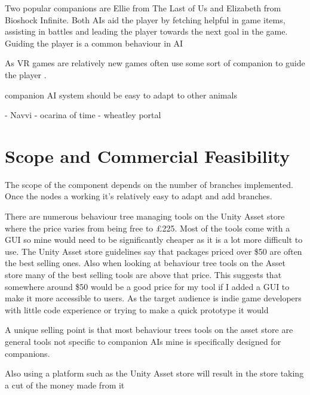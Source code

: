 \documentclass{scrartcl}
\begin{document}
Two popular companions are Ellie from The Last of Us and Elizabeth from Bioshock Infinite. Both AIs aid the player by fetching helpful in game items, assisting in battles and leading the player towards the next goal in the game.
Guiding the player is a common behaviour in AI 


As VR games are relatively new games often use some sort of companion to guide the player \cite{RobinsonVR} .


companion AI system 
should be easy to adapt to other animals

- Navvi - ocarina of time
- wheatley portal



\section{Scope and Commercial Feasibility}
The scope of the component depends on the number of branches implemented. Once the nodes a working it's relatively easy to adapt and add branches.

There are numerous behaviour tree managing tools on the Unity Asset store where the price varies from being free to \pounds225. Most of the tools come with a GUI so mine would need to be significantly cheaper as it is a lot more difficult to use.
The Unity Asset store guidelines say that packages priced over \$50 are often the best selling ones. Also when looking at behaviour tree tools on the Asset store many of the best selling tools are above that price. This suggests that somewhere around \$50 would be a good price for my tool if I added a GUI to make it more accessible to users. As the target audience is indie game developers with little code experience or trying to make a quick prototype it would 
\bigskip

 A unique selling point is that most behaviour trees tools on the asset store are general tools not specific to companion AIs mine is specifically designed for companions.


Also using a platform such as the Unity Asset store will result in the store taking a cut of the money made from it 





	
\end{document}
